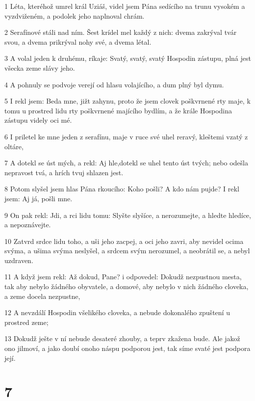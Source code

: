 \par 1 Léta, kteréhož umrel král Uziáš, videl jsem Pána sedícího na trunu vysokém a vyzdviženém, a podolek jeho naplnoval chrám.
\par 2 Serafínové stáli nad ním. Šest krídel mel každý z nich: dvema zakrýval tvár svou, a dvema prikrýval nohy své, a dvema létal.
\par 3 A volal jeden k druhému, ríkaje: Svatý, svatý, svatý Hospodin zástupu, plná jest všecka zeme slávy jeho.
\par 4 A pohnuly se podvoje verejí od hlasu volajícího, a dum plný byl dymu.
\par 5 I rekl jsem: Beda mne, jižt zahynu, proto že jsem clovek poškvrnené rty maje, k tomu u prostred lidu rty poškvrnené majícího bydlím, a že krále Hospodina zástupu videly oci mé.
\par 6 I priletel ke mne jeden z serafínu, maje v ruce své uhel reravý, kleštemi vzatý z oltáre,
\par 7 A dotekl se úst mých, a rekl: Aj hle,dotekl se uhel tento úst tvých; nebo odešla nepravost tvá, a hrích tvuj shlazen jest.
\par 8 Potom slyšel jsem hlas Pána rkoucího: Koho pošli? A kdo nám pujde? I rekl jsem: Aj já, pošli mne.
\par 9 On pak rekl: Jdi, a rci lidu tomu: Slyšte slyšíce, a nerozumejte, a hledte hledíce, a nepoznávejte.
\par 10 Zatvrd srdce lidu toho, a uši jeho zacpej, a oci jeho zavri, aby nevidel ocima svýma, a ušima svýma neslyšel, a srdcem svým nerozumel, a neobrátil se, a nebyl uzdraven.
\par 11 A když jsem rekl: Až dokud, Pane? i odpovedel: Dokudž nezpustnou mesta, tak aby nebylo žádného obyvatele, a domové, aby nebylo v nich žádného cloveka, a zeme docela nezpustne,
\par 12 A nevzdálí Hospodin všelikého cloveka, a nebude dokonalého zpuštení u prostred zeme;
\par 13 Dokudž ješte v ní nebude desateré zhouby, a teprv zkažena bude. Ale jakož ono jilmoví, a jako doubí onoho náspu podporou jest, tak síme svaté jest podpora její.

\chapter{7}

